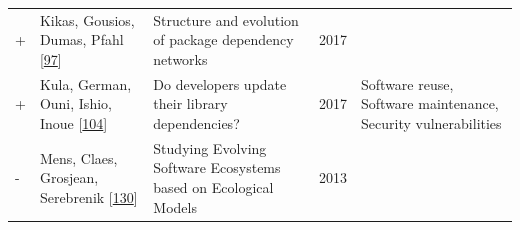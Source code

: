 \documentclass[]{book}
\begin{document}
\begin{longtable}[]{@{}lllll@{}}
\begin{minipage}[t]{0.01\columnwidth}
+\strut
\end{minipage} & \begin{minipage}[t]{0.09\columnwidth}\raggedright\strut
Kikas, Gousios, Dumas, Pfahl
{[}\protect\hyperlink{ref-Kikas2017}{97}{]}\strut
\end{minipage} & \begin{minipage}[t]{0.34\columnwidth}\raggedright\strut
Structure and evolution of package dependency networks\strut
\end{minipage} & \begin{minipage}[t]{0.02\columnwidth}\raggedright\strut
2017\strut
\end{minipage} & \begin{minipage}[t]{0.39\columnwidth}\raggedright\strut
\strut
\end{minipage}\tabularnewline
\begin{minipage}[t]{0.01\columnwidth}\raggedright\strut
+\strut
\end{minipage} & \begin{minipage}[t]{0.09\columnwidth}\raggedright\strut
Kula, German, Ouni, Ishio, Inoue
{[}\protect\hyperlink{ref-Kula2017}{104}{]}\strut
\end{minipage} & \begin{minipage}[t]{0.34\columnwidth}\raggedright\strut
Do developers update their library dependencies?\strut
\end{minipage} & \begin{minipage}[t]{0.02\columnwidth}\raggedright\strut
2017\strut
\end{minipage} & \begin{minipage}[t]{0.39\columnwidth}\raggedright\strut
Software reuse, Software maintenance, Security vulnerabilities\strut
\end{minipage}\tabularnewline
\begin{minipage}[t]{0.01\columnwidth}\raggedright\strut
-\strut
\end{minipage} & \begin{minipage}[t]{0.09\columnwidth}\raggedright\strut
Mens, Claes, Grosjean, Serebrenik
{[}\protect\hyperlink{ref-Mens2013}{130}{]}\strut
\end{minipage} & \begin{minipage}[t]{0.34\columnwidth}\raggedright\strut
Studying Evolving Software Ecosystems based on Ecological Models\strut
\end{minipage} & \begin{minipage}[t]{0.02\columnwidth}\raggedright\strut
2013\strut
\end{minipage} & \begin{minipage}[t]{0.39\columnwidth}\raggedright\strut

\end{minipage}
\end{longtable}
\end{document}
